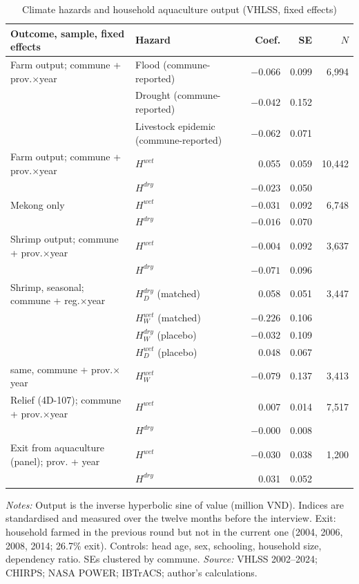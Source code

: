 \documentclass[11pt,a4paper]{article}
\begin{document}
\begin{table}[htbp]
\centering\footnotesize
\caption{Climate hazards and household aquaculture output (VHLSS, fixed effects)}
\label{tab:hhfe}
\begin{tabular}{@{}llrrr@{}}
\toprule
Outcome, sample, fixed effects & Hazard & Coef. & SE & $N$ \\
\midrule
Farm output; commune + prov.$\times$year & Flood (commune-reported) & $-0.066$ & 0.099 & 6,994 \\
 & Drought (commune-reported) & $-0.042$ & 0.152 & \\
 & Livestock epidemic (commune-reported) & $-0.062$ & 0.071 & \\
Farm output; commune + prov.$\times$year & $H^{wet}$ & 0.055 & 0.059 & 10,442 \\
 & $H^{dry}$ & $-0.023$ & 0.050 & \\
\quad Mekong only & $H^{wet}$ & $-0.031$ & 0.092 & 6,748 \\
 & $H^{dry}$ & $-0.016$ & 0.070 & \\
Shrimp output; commune + prov.$\times$year & $H^{wet}$ & $-0.004$ & 0.092 & 3,637 \\
 & $H^{dry}$ & $-0.071$ & 0.096 & \\
Shrimp, seasonal; commune + reg.$\times$year & $H^{dry}_D$ (matched) & 0.058 & 0.051 & 3,447 \\
 & $H^{wet}_W$ (matched) & $-0.226$ & 0.106 & \\
 & $H^{dry}_W$ (placebo) & $-0.032$ & 0.109 & \\
 & $H^{wet}_D$ (placebo) & 0.048 & 0.067 & \\
\quad same, commune + prov.$\times$year & $H^{wet}_W$ & $-0.079$ & 0.137 & 3,413 \\
Relief (4D-107); commune + prov.$\times$year & $H^{wet}$ & 0.007 & 0.014 & 7,517 \\
 & $H^{dry}$ & $-0.000$ & 0.008 & \\
Exit from aquaculture (panel); prov. + year & $H^{wet}$ & $-0.030$ & 0.038 & 1,200 \\
 & $H^{dry}$ & 0.031 & 0.052 & \\
\bottomrule
\end{tabular}
\begin{minipage}{\textwidth}\footnotesize
\textit{Notes:} Output is the inverse hyperbolic sine of value (million VND). Indices are standardised and measured over the twelve months before the interview. Exit: household farmed in the previous round but not in the current one (2004, 2006, 2008, 2014; 26.7\% exit). Controls: head age, sex, schooling, household size, dependency ratio. SEs clustered by commune. \textit{Source:} VHLSS 2002--2024; CHIRPS; NASA POWER; IBTrACS; author's calculations.
\end{minipage}
\end{table}
\end{document}
